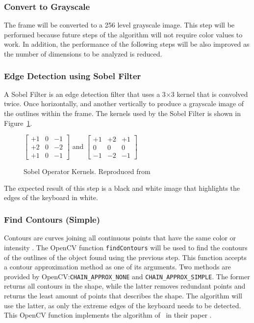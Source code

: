 \documentclass{report}
\begin{document}
\subsubsection{Convert to Grayscale}
The frame will be converted to a 256 level grayscale image. This step will be
performed because future steps of the algorithm will not require color values to
work. In addition, the performance of the following steps will be also improved
as the number of dimensions to be analyzed is reduced.

\subsubsection{Edge Detection using Sobel Filter}
A Sobel Filter is an edge detection filter that uses a 3$\times$3 kernel that is
convolved twice. Once horizontally, and another vertically to produce a
grayscale image of the outlines within the frame. The kernels used by the Sobel
Filter \parencite{sobel2014} is shown in Figure~\ref{fig:metho-algo-key-sobel}.

\begin{figure}[H]
	\centering
	$\begin{bmatrix}
			+1 & 0 & -1 \\
			+2 & 0 & -2 \\
			+1 & 0 & -1
		\end{bmatrix}$
	and
	$\begin{bmatrix}
			+1 & +2 & +1 \\
			0  & 0  & 0  \\
			-1 & -2 & -1
		\end{bmatrix}$
	\caption{Sobel Operator Kernels. Reproduced from }
	\label{fig:metho-algo-key-sobel}
\end{figure}

The expected result of this step is a black and white image that highlights the
edges of the keyboard in white.

\subsubsection{Find Contours (Simple)}
\label{section:metho-algo-key-contours}
Contours are curves joining all continuous points that have the same color or
intensity \parencite{opencv-contours}. The OpenCV function \texttt{findContours}
will be used to find the contours of the outlines of the object found using the
previous step. This function accepts a contour approximation method as one of
its arguments. Two methods are provided by OpenCV:\@\texttt{CHAIN\_APPROX\_NONE}
and \texttt{CHAIN\_APPROX\_SIMPLE}. The former returns all contours in the
shape, while the latter removes redundant points and returns the least amount of
points that describes the shape. The algorithm will use the latter, as only the
extreme edges of the keyboard needs to be detected. This OpenCV function
implements the algorithm of~\cite{contours} in their paper
.
\end{document}
